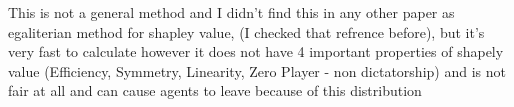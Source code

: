 \documentclass{article}
\begin{document}
This is not a general method and I didn't find this in any other paper as egaliterian method for shapley value, (I checked that refrence before), but it's very fast to calculate however it does not have 4 important properties of shapely value (Efficiency, Symmetry, Linearity, Zero Player - non dictatorship) and is not fair at all and can cause agents to leave because of this distribution
  
  
  
  
%
%
  
\end{document}
